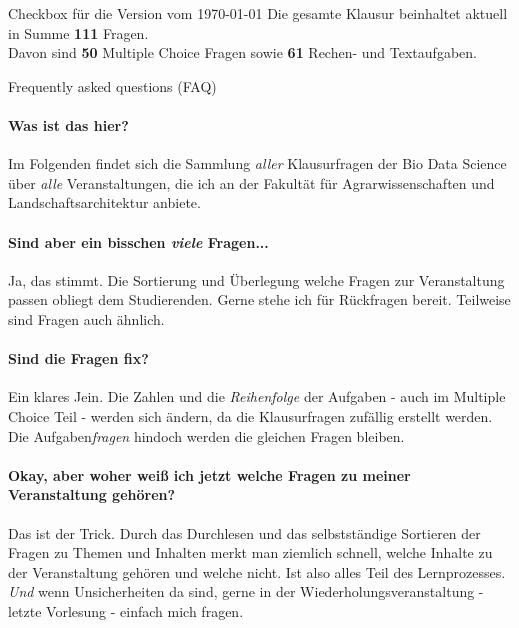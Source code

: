 \documentclass[a4paper, 10pt]{scrartcl}\usepackage[]{graphicx}\usepackage[]{xcolor}
\begin{document}
\begin{graybox}{Checkbox für die Version vom \today}
  \Large Die gesamte Klausur beinhaltet aktuell in Summe
  \textbf{111}
  Fragen.\\[1Ex]
  Davon sind \textbf{50} Multiple
  Choice Fragen sowie \textbf{61} Rechen- und
  Textaufgaben.
\end{graybox}

\vfill

\begin{takehomebox}{Frequently asked questions (FAQ)}
  \paragraph{Was ist das hier?} Im Folgenden findet sich die Sammlung
  \textit{aller} Klausurfragen der Bio Data Science über \textit{alle}
  Veranstaltungen, die ich an der Fakultät für Agrarwissenschaften und
  Landschaftsarchitektur anbiete.
  \vspace{1Ex}
  \paragraph{Sind aber ein bisschen \textit{viele} Fragen...} Ja, das
  stimmt. Die Sortierung und Überlegung welche Fragen zur Veranstaltung
  passen obliegt dem Studierenden. Gerne stehe ich für Rückfragen
  bereit. Teilweise sind Fragen auch ähnlich.
  \vspace{1Ex}
  \paragraph{Sind die Fragen fix?} Ein klares Jein. Die Zahlen und die
  \textit{Reihenfolge} der Aufgaben - auch im Multiple Choice Teil - werden
  sich ändern, da die Klausurfragen zufällig erstellt werden. Die
  Aufgaben\textit{fragen} hindoch werden die gleichen Fragen bleiben.
  \vspace{1Ex}
  \paragraph{Okay, aber woher weiß ich jetzt welche Fragen zu meiner
    Veranstaltung gehören?} Das ist der Trick. Durch das Durchlesen und das
  selbstständige Sortieren der Fragen zu Themen und Inhalten merkt man
  ziemlich schnell, welche Inhalte zu der Veranstaltung gehören und welche
  nicht. Ist also alles Teil des Lernprozesses. \textit{Und} wenn
  Unsicherheiten da sind, gerne in der Wiederholungsveranstaltung - letzte
  Vorlesung - einfach mich fragen.
  \vspace{1Ex}

\end{takehomebox}
\end{document}
